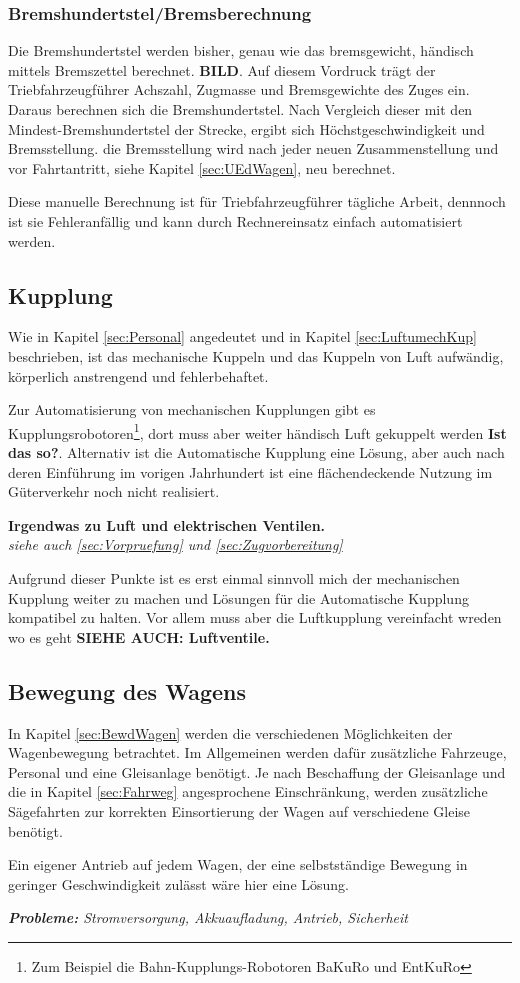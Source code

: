 \subsubsection{Bremshundertstel/Bremsberechnung}
Die Bremshundertstel werden bisher, genau wie das bremsgewicht, händisch mittels Bremszettel berechnet. \textbf{BILD}. Auf diesem Vordruck trägt der Triebfahrzeugführer Achszahl, Zugmasse und Bremsgewichte des Zuges ein. Daraus berechnen sich die Bremshundertstel. Nach Vergleich dieser mit den Mindest-Bremshundertstel der Strecke, ergibt sich Höchstgeschwindigkeit und Bremsstellung. die Bremsstellung wird nach jeder neuen Zusammenstellung und vor Fahrtantritt, siehe Kapitel \ref{sec:UEdWagen}, neu berechnet.\par
Diese manuelle Berechnung ist für Triebfahrzeugführer tägliche Arbeit, dennnoch ist sie Fehleranfällig und kann durch Rechnereinsatz einfach automatisiert werden.

\subsection{Kupplung}
Wie in Kapitel \ref{sec:Personal} angedeutet und in Kapitel \ref{sec:LuftumechKup} beschrieben, ist das mechanische Kuppeln und das Kuppeln von Luft aufwändig, körperlich anstrengend und fehlerbehaftet. \par
Zur Automatisierung von mechanischen Kupplungen gibt es Kupplungsrobotoren\footnote{Zum Beispiel die Bahn-Kupplungs-Robotoren BaKuRo und EntKuRo}, dort muss aber weiter händisch Luft gekuppelt werden \textbf{Ist das so?}. Alternativ ist die Automatische Kupplung eine Lösung, aber auch nach deren Einführung im vorigen Jahrhundert ist eine flächendeckende Nutzung im Güterverkehr noch nicht realisiert.\par
\textbf{Irgendwas zu Luft und elektrischen Ventilen.}\\
\textit{siehe auch \ref{sec:Vorpruefung} und \ref{sec:Zugvorbereitung}}
\par
Aufgrund dieser Punkte ist es erst einmal sinnvoll mich der mechanischen Kupplung weiter zu machen und Lösungen für die Automatische Kupplung kompatibel zu halten. Vor allem muss aber die Luftkupplung vereinfacht wreden wo es geht \textbf{ SIEHE AUCH: Luftventile.}

\subsection{Bewegung des Wagens}
In Kapitel \ref{sec:BewdWagen} werden die verschiedenen Möglichkeiten der Wagenbewegung betrachtet. Im Allgemeinen werden dafür zusätzliche Fahrzeuge, Personal und eine Gleisanlage benötigt. Je nach Beschaffung der Gleisanlage und die in Kapitel \ref{sec:Fahrweg} angesprochene Einschränkung, werden zusätzliche Sägefahrten zur korrekten Einsortierung der Wagen auf verschiedene Gleise benötigt. \par
Ein eigener Antrieb auf jedem Wagen, der eine selbstständige Bewegung in geringer Geschwindigkeit zulässt wäre hier eine Lösung.\par
\textit{\textbf{Probleme:} Stromversorgung, Akkuaufladung, Antrieb, Sicherheit}
